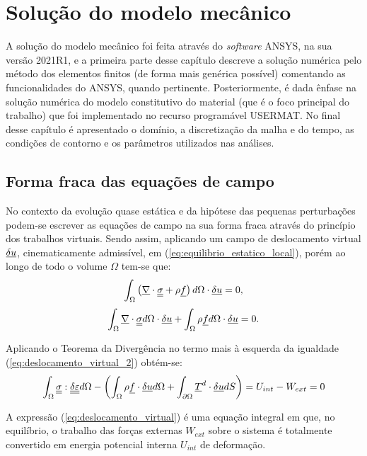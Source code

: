 \chapter{Solução do modelo mecânico}
A solução do modelo mecânico foi feita através do \textit{software} ANSYS, na sua versão 2021R1, e a primeira parte desse capítulo descreve a solução numérica pelo método dos elementos finitos (de forma mais genérica possível) comentando as funcionalidades do ANSYS, quando pertinente. Posteriormente, é dada ênfase na solução numérica do modelo constitutivo do material (que é o foco principal do trabalho) que foi implementado no recurso programável USERMAT. No final desse capítulo é apresentado o domínio, a discretização da malha e do tempo, as condições de contorno e os parâmetros utilizados nas análises.

\section{Forma fraca das equações de campo}
No contexto da evolução quase estática e da hipótese das pequenas perturbações podem-se escrever as equações de campo na sua forma fraca através do princípio dos trabalhos virtuais. Sendo assim, aplicando um campo de deslocamento virtual $\underline {\delta u}$, cinematicamente admissível, em (\ref{eq:equilibrio_estatico_local}), porém ao longo de todo o volume $\Omega$ tem-se que:
\begin{equation}
	\label{eq:deslocamento_virtual}
	\int_{\Omega} \left(\underline \nabla \cdot \underline{\underline \sigma} + \rho \underline f \right)d\Omega \cdot \underline {\delta u} = 0,
\end{equation}
\begin{equation}
	\label{eq:deslocamento_virtual_2}
	\int_{\Omega} \underline \nabla \cdot \underline{\underline \sigma} d\Omega \cdot \underline {\delta u} + \int_{\Omega} \rho \underline f d\Omega \cdot \underline {\delta u} = 0.
\end{equation}

Aplicando o Teorema da Divergência no termo mais à esquerda da igualdade (\ref{eq:deslocamento_virtual_2}) obtém-se:
\begin{equation}
	\label{eq:deslocamento_virtual_3}
	\int_{\Omega} \underline{\underline \sigma} : \underline{\underline {\delta \varepsilon}} d\Omega - \left(\int_{\Omega} \rho \underline f \cdot \underline {\delta u} d\Omega + \int_{\partial \Omega} \underline T^d \cdot \underline {\delta u} dS \right) = U_{int} - W_{ext} = 0
\end{equation}

A expressão (\ref{eq:deslocamento_virtual}) é uma equação integral em que, no equilíbrio, o trabalho das forças externas $W_{ext}$ sobre o sistema é totalmente convertido em energia potencial interna $U_{int}$  de deformação.

